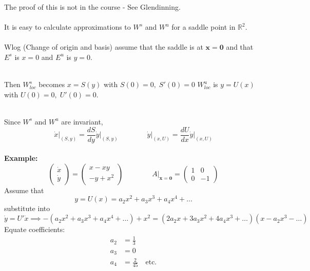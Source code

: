 \documentclass{article}
\newcommand{\example}{\textbf{Example:}}                    %
\begin{document}
The proof of this is not in the course - See Glendinning.
\\
\\
It is easy to calculate approximations to $W^s$ and $W^u$ for a saddle point
in $\mathbb{R}^2$.
\\
\\
Wlog (Change of origin and basis) assume that the saddle is at $\bm{x}=\bm{0}$
and that $E^s$ is $x=0$ and $E^u$ is $y=0$.
\\
\\
\begin{minipage}[c][0.2\textwidth][c]{0.2\textwidth}
\end{minipage}
\begin{minipage}[c][0.2\textwidth][c]{0.6\textwidth}
Then $W^s_{loc}$ becomes $x = S(y)$ with $S(0) =0, \; S'(0)=0$ 
$W^u_{loc}$ is $y = U(x)$ with $U(0) =0, \; U'(0)=0$.
\end{minipage}
\\
Since $W^s$ and $W^u$ are invariant,
\\
\[
 \left. \dot{x}\right|_{(S,y)} = \frac{dS}{dy} \left.\dot{y}\right|_{(S,y)} \qquad \qquad
 \left.\dot{y}\right|_{(x,U)} = \frac{dU}{dx} \left.\dot{y}\right|_{(x,U)}
\]
\\
\example\ 
\[ \left( \begin{array}{c} \dot{x} \\ \dot{y} \end{array} \right) = 
\left( \begin{array}{c} x - xy \\ -y+x^2 \end{array} \right) \qquad \qquad
A|_{\bm{x} = \bm{0}} = \left( \begin{array}{cr} 1 & 0 \\ 0 & -1 \end{array} \right) \]
Assume that
\[ y = U(x) = a_2 x^2 + a_3 x^3 + a_4 x^4 + \dots \]
substitute into 
\[ \dot{y} = U'\dot{x}  \implies -(a_2x^2+a_3x^3 + a_4x^4 + \dots) + x^2 
= (2a_2x + 3a_3x^2 + 4a_4x^3 + \dots)(x - a_2x^3 - \dots ) \]
Equate coefficients:
\begin{align*}
a_2 &= \frac{1}{3} \\
a_3 &= 0 \\
a_4 &= \frac{2}{45} \quad \mbox{etc.}
\end{align*}
\end{document}
